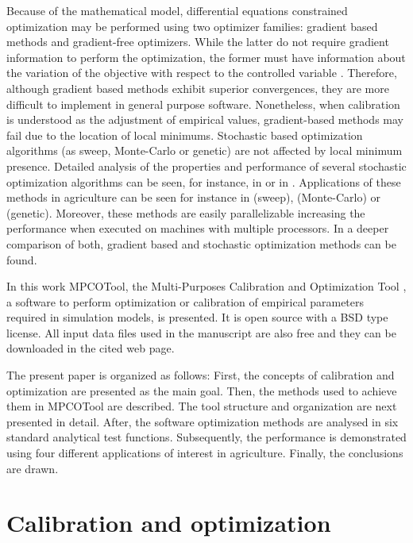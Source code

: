 \documentclass[review,authoryear]{elsarticle}
\begin{document}
Because of the mathematical model, differential equations constrained
optimization may be performed using two optimizer families: gradient based
methods and gradient-free optimizers. While the latter do not require gradient
information to perform the optimization, the former must have information about
the variation of the objective with respect to the controlled variable
\citep{Lacasta15}. Therefore, although gradient based methods exhibit superior
convergences, they are more difficult to implement in general purpose software.
Nonetheless, when calibration is understood as the adjustment of empirical
values, gradient-based methods may fail due to the location of local minimums.
Stochastic based optimization algorithms (as sweep, Monte-Carlo or genetic) are
not affected by local minimum presence. 
Detailed analysis of the properties and performance of several stochastic
optimization algorithms can be seen, for instance, in \citet{Back96} or in
\citet{HauptHaupt04}.
Applications of these methods in
agriculture can be seen for instance in \citet{JaviSurcos2} (sweep),
\citet{Ouazaa15} (Monte-Carlo) or \citet{Ebrahimiam13} (genetic). Moreover,
these methods are easily parallelizable increasing the performance when executed
on machines with multiple processors. In \cite{Lacasta15} a deeper comparison of
both, gradient based and stochastic optimization methods can be found.

In this work MPCOTool, the Multi-Purposes Calibration and Optimization Tool
\citep{MPCOToolGit}, a software to perform
optimization or calibration of empirical parameters required in simulation
models, is presented. It is open source with a BSD type license. All input data
files used in the manuscript are also free and they can be downloaded in the
cited web page.

The present paper is organized as follows: First, the concepts of calibration
and optimization are presented as the main goal. Then, the methods used to
achieve them in MPCOTool are described. The tool structure and organization
are next presented in detail. After,
the software optimization methods are analysed in six standard analytical test
functions. Subsequently,
the performance is demonstrated using four different applications of interest in agriculture. Finally, the conclusions are drawn.

\section{Calibration and optimization}
\end{document}

